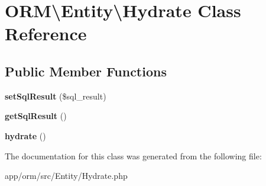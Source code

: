 \hypertarget{classORM_1_1Entity_1_1Hydrate}{}\section{O\+RM\textbackslash{}Entity\textbackslash{}Hydrate Class Reference}
\label{classORM_1_1Entity_1_1Hydrate}
\subsection*{Public Member Functions}
\begin{DoxyCompactItemize}
\item 
{\bfseries set\+Sql\+Result} (\$sql\+\_\+result)\hypertarget{classORM_1_1Entity_1_1Hydrate_a2b37dc9f3af5c1538a1ee6f0b6291c68}{}\label{classORM_1_1Entity_1_1Hydrate_a2b37dc9f3af5c1538a1ee6f0b6291c68}

\item 
{\bfseries get\+Sql\+Result} ()\hypertarget{classORM_1_1Entity_1_1Hydrate_a083c239d6782e20815b7822082e18089}{}\label{classORM_1_1Entity_1_1Hydrate_a083c239d6782e20815b7822082e18089}

\item 
{\bfseries hydrate} ()\hypertarget{classORM_1_1Entity_1_1Hydrate_a24446d2308e8ca1ef2ab0eaaf5945e75}{}\label{classORM_1_1Entity_1_1Hydrate_a24446d2308e8ca1ef2ab0eaaf5945e75}

\end{DoxyCompactItemize}


The documentation for this class was generated from the following file\+:\begin{DoxyCompactItemize}
\item 
app/orm/src/\+Entity/Hydrate.\+php\end{DoxyCompactItemize}
